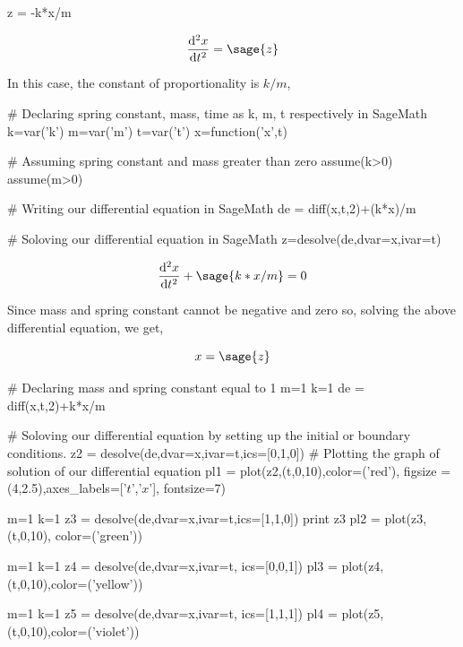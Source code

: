 \begin{sagesilent}
z = -k*x/m
\end{sagesilent}

\begin{equation}
\frac{\mathrm{d}^{2}x}{\mathrm{d}t^{2}} = \sage{z}
\end{equation}

In this case, the constant of proportionality is $k/m$,

\begin{sagesilent}
# Declaring spring constant, mass, time as k, m, t respectively in SageMath
k=var('k')
m=var('m')
t=var('t')
x=function('x',t)

# Assuming spring constant and mass greater than zero
assume(k>0)
assume(m>0)

# Writing our differential equation in SageMath
de = diff(x,t,2)+(k*x)/m

# Soloving our differential equation in SageMath
z=desolve(de,dvar=x,ivar=t)
\end{sagesilent}

\begin{equation}
  \frac{\mathrm{d}^{2}x}{\mathrm{d}t^{2}} +  \sage{k*x/m} = 0
\end{equation}

Since mass and spring constant cannot be negative and zero so, solving the above differential equation, we get,

\begin{equation}
x = \sage{z}
\end{equation}

\begin{sagesilent}
# Declaring mass and spring constant equal to 1
m=1
k=1
de = diff(x,t,2)+k*x/m

# Soloving our differential equation by setting up the initial or boundary conditions.
z2 = desolve(de,dvar=x,ivar=t,ics=[0,1,0])
# Plotting the graph of solution of our differential equation
pl1 = plot(z2,(t,0,10),color=('red'), figsize = (4,2.5),axes_labels=['$t$','$x$'], fontsize=7)

m=1
k=1
z3 = desolve(de,dvar=x,ivar=t,ics=[1,1,0])
print z3
pl2 = plot(z3,(t,0,10), color=('green'))

m=1
k=1
z4 = desolve(de,dvar=x,ivar=t, ics=[0,0,1])
pl3 = plot(z4,(t,0,10),color=('yellow'))

m=1
k=1
z5 = desolve(de,dvar=x,ivar=t, ics=[1,1,1])
pl4 = plot(z5,(t,0,10),color=('violet'))
\end{sagesilent}

